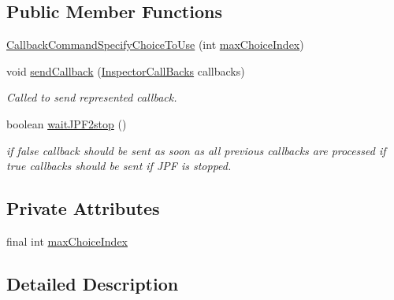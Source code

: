 \subsection*{Public Member Functions}
\begin{DoxyCompactItemize}
\item 
\hyperlink{classgov_1_1nasa_1_1jpf_1_1inspector_1_1server_1_1callbacks_1_1commands_1_1_callback_command_specify_choice_to_use_ae406c1ce4ab7703e587dfd337a36a0e6}{Callback\+Command\+Specify\+Choice\+To\+Use} (int \hyperlink{classgov_1_1nasa_1_1jpf_1_1inspector_1_1server_1_1callbacks_1_1commands_1_1_callback_command_specify_choice_to_use_ab5382d28f683284f739983494ad94584}{max\+Choice\+Index})
\item 
void \hyperlink{classgov_1_1nasa_1_1jpf_1_1inspector_1_1server_1_1callbacks_1_1commands_1_1_callback_command_specify_choice_to_use_a581ac34e0c2e0b6c3f09798b7e8bdb08}{send\+Callback} (\hyperlink{interfacegov_1_1nasa_1_1jpf_1_1inspector_1_1interfaces_1_1_inspector_call_backs}{Inspector\+Call\+Backs} callbacks)
\begin{DoxyCompactList}\small\item\em Called to send represented callback. \end{DoxyCompactList}\item 
boolean \hyperlink{classgov_1_1nasa_1_1jpf_1_1inspector_1_1server_1_1callbacks_1_1commands_1_1_callback_command_specify_choice_to_use_ad8864c40e6d457618ef1f0e67727dadf}{wait\+J\+P\+F2stop} ()
\begin{DoxyCompactList}\small\item\em if false callback should be sent as soon as all previous callbacks are processed if true callbacks should be sent if J\+PF is stopped. \end{DoxyCompactList}\end{DoxyCompactItemize}
\subsection*{Private Attributes}
\begin{DoxyCompactItemize}
\item 
final int \hyperlink{classgov_1_1nasa_1_1jpf_1_1inspector_1_1server_1_1callbacks_1_1commands_1_1_callback_command_specify_choice_to_use_ab5382d28f683284f739983494ad94584}{max\+Choice\+Index}
\end{DoxyCompactItemize}


\subsection{Detailed Description}



